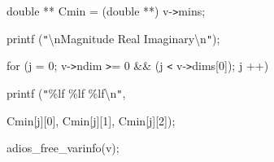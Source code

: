 \vspace{10pt}
double ** Cmin = (double **) v-\texttt{>}mins;

\vspace{10pt}
printf (\texttt{"}\textbackslash{}nMagnitude  Real  Imaginary\textbackslash{}n\texttt{"});

\vspace{10pt}
for (j = 0; v-\texttt{>}ndim \texttt{>}= 0 \&\&  (j \texttt{<} v-\texttt{>}dims[0]); 
j ++) 

\vspace{10pt}
printf (\texttt{"}\%lf \%lf \%lf\textbackslash{}n\texttt{"}, 

\vspace{10pt}
Cmin[j][0], Cmin[j][1], Cmin[j][2]);

\vspace{10pt}
adios\_free\_varinfo(v);\label{HToc82064268}\label{HToc82067516}\label{HToc84890309}\label{HToc212016684}\label{HToc212016926}\label{HToc82067538}\label{HToc182553452}
